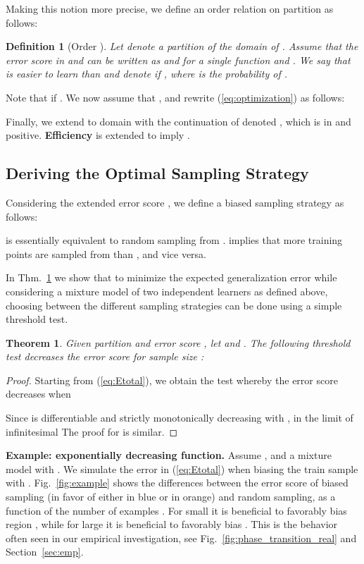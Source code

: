\documentclass{article}
\newcommand{\myparagraph}[1]{\smallskip\noindent\textbf{#1}}
\newtheorem{theorem}{Theorem}
\newtheorem{defn}{Definition}
\begin{document}
Making this notion more precise, we define an order relation on partition  as follows:
\begin{defn}[Order ] 
Let  denote a partition of the domain of . Assume that the error score in  and  can be written as  and  for a single function  and . We say that  is easier to learn than  and denote {} if , where  is the probability of .
\label{def:ease}
\end{defn} 
Note that  if . We now assume that , and rewrite (\ref{eq:optimization}) as follows:

Finally, we extend  to domain  with the continuation of  denoted , which is in  and positive. \textbf{Efficiency} is extended to imply . 
\subsection{Deriving the Optimal Sampling Strategy}
\label{sec:biased}


Considering the extended error score , we define a biased sampling strategy as follows:


 is essentially equivalent to random sampling from .
 implies that more training points are sampled from  than , and vice versa.

In Thm.~\ref{thm:threshold_test} we show that to minimize the expected generalization error while considering a mixture model of two independent learners as defined above, choosing between the different sampling strategies can be done using a simple threshold test. 

\begin{theorem}
\label{thm:threshold_test}
Given partition  and error score , let  and . The following threshold test decreases the error score for sample size :

\end{theorem}

\begin{proof}
Starting from (\ref{eq:Etotal}), we obtain the test whereby the error score  decreases when 

Since  is differentiable and strictly monotonically decreasing with , in the limit of infinitesimal  
The proof for  is similar.
\end{proof}

\myparagraph{Example: exponentially decreasing function.}
Assume , and a mixture model with . We simulate the error in (\ref{eq:Etotal}) when biasing the train sample with . Fig.~\ref{fig:example} shows the differences between the error score of biased sampling (in favor of either  in blue or  in orange) and random sampling, as a function of the number of examples . For small  it is beneficial to favorably bias region , while for large  it is beneficial to favorably bias . This is the behavior often seen in our empirical investigation, see Fig.~\ref{fig:phase_transition_real} and Section~\ref{sec:emp}. 
\end{document}
